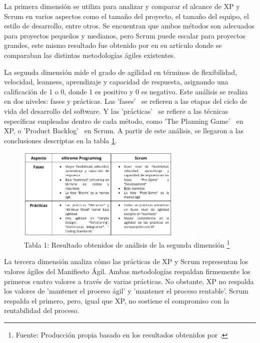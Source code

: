 \documentclass[a4paper,10pt]{article}
\begin{document}
	La primera dimensión se utiliza para analizar y comparar el alcance de XP y Scrum en varios aspectos como el tamaño del proyecto, el tamaño del equipo, el estilo de desarrollo, entre otros. Se encuentran que ambos métodos son adecuados para proyectos pequeños y medianos, pero Scrum puede escalar para proyectos grandes, este mismo resultado fue obtenido por \textcite{quinonez2017analisis} en su artículo donde se comparaban las distintas metodologías ágiles existentes.
	
	La segunda dimensión mide el grado de agilidad en términos de flexibilidad, velocidad, leanness, aprendizaje y capacidad de respuesta, asignando una calificación de 1 o 0, donde 1 es positivo y 0 es negativo. Este análisis se realiza en dos niveles: fases y prácticas. Las 'fases' \ se refieren a las etapas del ciclo de vida del desarrollo del software. Y las 'prácticas' \ se refiere a las técnicas específicas empleadas dentro de cada método, como 'The Planning Game' \ en XP, o 'Product Backlog' \ en Scrum. A partir de este análisis, se llegaron a las conclusiones descriptas en la tabla \ref{tabla_resultado_2daDimencon_4D}.
	\begin{figure}[h]
		\centering
		\includegraphics[width=0.7\textwidth]{tabla-resultados-segunda-fase.png}
		\caption[Tabla resultados 4D]{Tabla 1: Resultado obtenidos de análisis de la segunda dimensión \footnote{Fuente: Producción propia basado en los resultados obtenidos por \textcite{Gill_Henderson-Sellers_2006}.}}
		\label{tabla_resultado_2daDimencon_4D}
	\end{figure}
	
	La tercera dimensión analiza cómo las prácticas de XP y Scrum representan los valores ágiles del Manifiesto Ágil. Ambas metodologías respaldan firmemente los primeros cuatro valores a través de varias prácticas. No obstante, XP no respalda los valores de 'mantener el proceso ágil' y 'mantener el proceso rentable'. Scrum respalda el primero, pero, igual que XP, no sostiene el compromiso con la rentabilidad del proceso.
	
\end{document}
